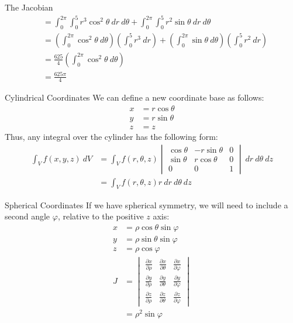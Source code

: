 \documentclass[8pt]{extarticle}
\begin{document}
\begin{problem}{The Jacobian}
\begin{align*}
                                     &=\int_{0}^{2\pi}\int_{0}^{5}r^3\cos^2\theta~dr~d\theta + \int_{0}^{2\pi}\int_{0}^{5}r^2\sin\theta~dr~d\theta\\
                                     &= \left(\int_{0}^{2\pi}\cos^2\theta~d\theta\right)\left(\int_{0}^{5}r^3~dr\right) + \left(\int_{0}^{2\pi}\sin\theta~d\theta\right)\left(\int_{0}^{5}r^2~dr\right)\\
                                     &= \frac{625}{4}\left(\int_{0}^{2\pi}\cos^2\theta~d\theta\right)\\
                                     &= \frac{625\pi}{4}
    \end{align*}
  \end{problem}
  \begin{problem}{Cylindrical Coordinates}
    We can define a new coordinate base as follows:
    \begin{align*}
      x &= r\cos \theta\\
      y &= r\sin\theta\\
      z &= z
    \end{align*}
    Thus, any integral over the cylinder has the following form:
    \begin{align*}
      \int_{V}f(x,y,z)~dV &= \int_{V} f(r,\theta,z)\begin{vmatrix}\cos\theta & -r\sin\theta & 0\\ \sin\theta &r\cos\theta & 0 \\  0 & 0 & 1\end{vmatrix}~dr~d\theta~dz\\
                          &= \int_{V}f(r,\theta,z)r~dr~d\theta~dz
    \end{align*}
  \end{problem}
  \begin{problem}{Spherical Coordinates}
    If we have spherical symmetry, we will need to include a second angle $\varphi$, relative to the positive $z$ axis:
    \begin{align*}
      x &= \rho\cos\theta\sin\varphi\\
      y &= \rho\sin\theta\sin\varphi\\
      z &= \rho\cos\varphi\\
      J &= \begin{vmatrix}
        \frac{\partial x}{\partial \rho} & \frac{\partial x}{\partial \theta} & \frac{\partial x}{\partial \varphi}\\
        \frac{\partial y}{\partial \rho} & \frac{\partial y}{\partial \theta} & \frac{\partial y}{\partial \varphi}\\
        \frac{\partial z}{\partial \rho} & \frac{\partial z}{\partial \theta} & \frac{\partial z}{\partial \varphi}
      \end{vmatrix}\\
        &= \rho^2\sin \varphi
    \end{align*}
  \end{problem}
\end{document}
